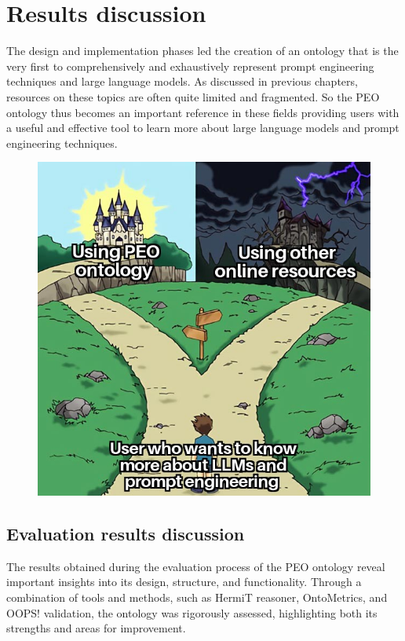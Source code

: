 \newpage
\section{Results discussion}
The design and implementation phases led the creation of an ontology that is the very first to comprehensively and exhaustively represent prompt engineering techniques and large language models. As discussed in previous chapters, resources on these topics are often quite limited and fragmented. So the PEO ontology thus becomes an important reference in these fields providing users with a useful and effective tool to learn more about large language models and prompt engineering techniques.

\begin{figure}[H]
    \centering
    \includegraphics[width=0.6\linewidth]{Figures/fig_77.jpg}
\end{figure}

\subsection{Evaluation results discussion}
The results obtained during the evaluation process of the PEO ontology reveal important insights into its design, structure, and functionality. Through a combination of tools and methods, such as HermiT reasoner, OntoMetrics, and OOPS! validation, the ontology was rigorously assessed, highlighting both its strengths and areas for improvement.


